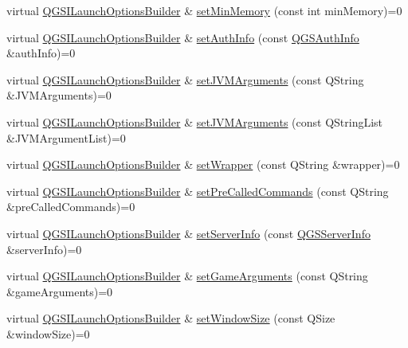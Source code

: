 \begin{DoxyCompactItemize}
virtual \mbox{\hyperlink{class_q_g_s_i_launch_options_builder}{Q\+G\+S\+I\+Launch\+Options\+Builder}} \& \mbox{\hyperlink{class_q_g_s_i_launch_options_builder_a7a33701b3c4b06343071c7073285744d}{set\+Min\+Memory}} (const int min\+Memory)=0
\item 
virtual \mbox{\hyperlink{class_q_g_s_i_launch_options_builder}{Q\+G\+S\+I\+Launch\+Options\+Builder}} \& \mbox{\hyperlink{class_q_g_s_i_launch_options_builder_a8d9cf0b083391ec128ca601f95436aa8}{set\+Auth\+Info}} (const \mbox{\hyperlink{class_q_g_s_auth_info}{Q\+G\+S\+Auth\+Info}} \&auth\+Info)=0
\item 
virtual \mbox{\hyperlink{class_q_g_s_i_launch_options_builder}{Q\+G\+S\+I\+Launch\+Options\+Builder}} \& \mbox{\hyperlink{class_q_g_s_i_launch_options_builder_a4739acc4ebefaac2e41a9ee7264913a1}{set\+J\+V\+M\+Arguments}} (const Q\+String \&J\+V\+M\+Arguments)=0
\item 
virtual \mbox{\hyperlink{class_q_g_s_i_launch_options_builder}{Q\+G\+S\+I\+Launch\+Options\+Builder}} \& \mbox{\hyperlink{class_q_g_s_i_launch_options_builder_af5a17db86753583d29a0776b05e67387}{set\+J\+V\+M\+Arguments}} (const Q\+String\+List \&J\+V\+M\+Argument\+List)=0
\item 
virtual \mbox{\hyperlink{class_q_g_s_i_launch_options_builder}{Q\+G\+S\+I\+Launch\+Options\+Builder}} \& \mbox{\hyperlink{class_q_g_s_i_launch_options_builder_aa789a60c4b15f5ba900046eed709de2f}{set\+Wrapper}} (const Q\+String \&wrapper)=0
\item 
virtual \mbox{\hyperlink{class_q_g_s_i_launch_options_builder}{Q\+G\+S\+I\+Launch\+Options\+Builder}} \& \mbox{\hyperlink{class_q_g_s_i_launch_options_builder_a5e1555d99d7bb16da007dd9e2fd88e9a}{set\+Pre\+Called\+Commands}} (const Q\+String \&pre\+Called\+Commands)=0
\item 
virtual \mbox{\hyperlink{class_q_g_s_i_launch_options_builder}{Q\+G\+S\+I\+Launch\+Options\+Builder}} \& \mbox{\hyperlink{class_q_g_s_i_launch_options_builder_adbb11b42b51fa0503ac673e7fc9ad100}{set\+Server\+Info}} (const \mbox{\hyperlink{class_q_g_s_server_info}{Q\+G\+S\+Server\+Info}} \&server\+Info)=0
\item 
virtual \mbox{\hyperlink{class_q_g_s_i_launch_options_builder}{Q\+G\+S\+I\+Launch\+Options\+Builder}} \& \mbox{\hyperlink{class_q_g_s_i_launch_options_builder_a6f428d4accdd640f6a3e58a3d69d2e6c}{set\+Game\+Arguments}} (const Q\+String \&game\+Arguments)=0
\item 
virtual \mbox{\hyperlink{class_q_g_s_i_launch_options_builder}{Q\+G\+S\+I\+Launch\+Options\+Builder}} \& \mbox{\hyperlink{class_q_g_s_i_launch_options_builder_a9ae589d52294839563a4c4b48ecf59da}{set\+Window\+Size}} (const Q\+Size \&window\+Size)=0

\end{DoxyCompactItemize}
